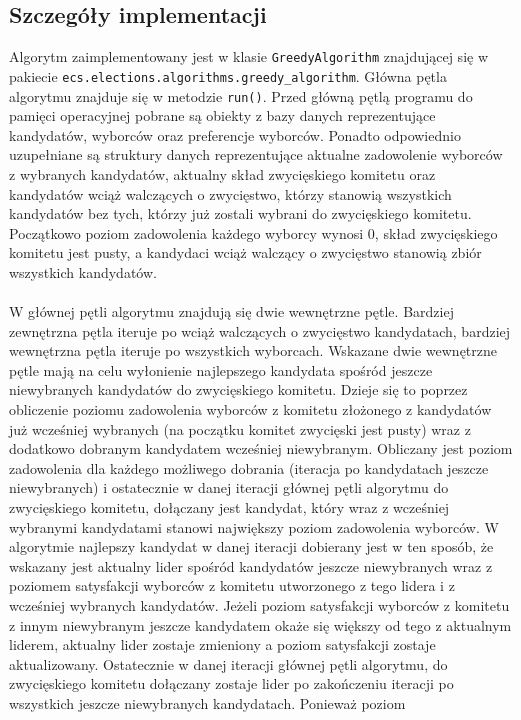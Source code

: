 \documentclass[pdflatex,11pt]{../aghdoc_version2}
\newcommand{\code}[1]{\texttt{#1}}
\begin{document}
\subsection{Szczegóły implementacji}
Algorytm zaimplementowany jest w klasie \code{GreedyAlgorithm} znajdującej się w pakiecie
\code{ecs.elections.algorithms.greedy\_algorithm}. Główna pętla algorytmu znajduje się w metodzie
\code{run()}. Przed główną pętlą programu do pamięci operacyjnej pobrane są obiekty z bazy danych
reprezentujące kandydatów, wyborców oraz preferencje wyborców. Ponadto odpowiednio
uzupełniane są struktury danych reprezentujące aktualne zadowolenie wyborców z wybranych kandydatów, aktualny skład zwycięskiego komitetu oraz kandydatów wciąż
walczących o zwycięstwo, którzy stanowią wszystkich kandydatów bez tych, którzy już
zostali wybrani do zwycięskiego komitetu. Początkowo poziom zadowolenia każdego
wyborcy wynosi $0$, skład zwycięskiego komitetu jest pusty, a kandydaci wciąż walczący o
zwycięstwo stanowią zbiór wszystkich kandydatów. \\ \\
W głównej pętli algorytmu znajdują się dwie wewnętrzne pętle. Bardziej zewnętrzna pętla
iteruje po wciąż walczących o zwycięstwo kandydatach, bardziej wewnętrzna pętla iteruje po
wszystkich wyborcach. Wskazane dwie wewnętrzne pętle mają na celu wyłonienie
najlepszego kandydata spośród jeszcze niewybranych kandydatów do zwycięskiego
komitetu. Dzieje się to poprzez obliczenie poziomu zadowolenia wyborców z komitetu
złożonego z kandydatów już wcześniej wybranych (na początku komitet zwycięski jest pusty)
wraz z dodatkowo dobranym kandydatem wcześniej niewybranym. Obliczany jest poziom
zadowolenia dla każdego możliwego dobrania (iteracja po kandydatach jeszcze
niewybranych) i ostatecznie w danej iteracji głównej pętli algorytmu do zwycięskiego
komitetu, dołączany jest kandydat, który wraz z wcześniej wybranymi kandydatami stanowi
największy poziom zadowolenia wyborców. W algorytmie najlepszy kandydat w danej iteracji
dobierany jest w ten sposób, że wskazany jest aktualny lider spośród kandydatów jeszcze
niewybranych wraz z poziomem satysfakcji wyborców z komitetu utworzonego z tego lidera i
z wcześniej wybranych kandydatów. Jeżeli poziom satysfakcji wyborców z komitetu z innym
niewybranym jeszcze kandydatem okaże się większy od tego z aktualnym liderem, aktualny
lider zostaje zmieniony a poziom satysfakcji zostaje aktualizowany. Ostatecznie w danej
iteracji głównej pętli algorytmu, do zwycięskiego komitetu dołączany zostaje lider po
zakończeniu iteracji po wszystkich jeszcze niewybranych kandydatach. Ponieważ poziom
\end{document}
